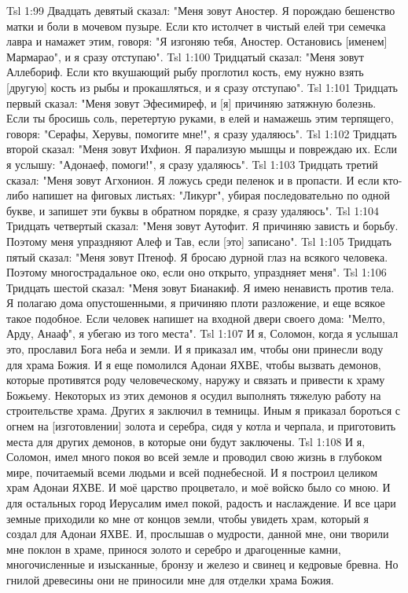 \vs Tsl 1:99 
Двадцать девятый сказал: "Меня зовут Аностер. Я порождаю бешенство матки и боли в мочевом пузыре. Если кто истолчет в чистый елей три семечка лавра и намажет этим, говоря: "Я изгоняю тебя, Аностер. Остановись [именем] Мармарао", и я сразу отступаю".
\vs Tsl 1:100 
Тридцатый сказал: "Меня зовут Аллебориф. Если кто вкушающий рыбу проглотил кость, ему нужно взять [другую] кость из рыбы и прокашляться, и я сразу отступаю".
\vs Tsl 1:101 
Тридцать первый сказал: "Меня зовут Эфесимиреф, и [я] причиняю затяжную болезнь. Если ты бросишь соль, перетертую руками, в елей и намажешь этим терпящего, говоря: "Серафы, Херувы, помогите мне!", я сразу удаляюсь".
\vs Tsl 1:102 
Тридцать второй сказал: "Меня зовут Ихфион. Я парализую мышцы и повреждаю их. Если я услышу: "Адонаеф, помоги!", я сразу удаляюсь".
\vs Tsl 1:103 
Тридцать третий сказал: "Меня зовут Агхонион. Я ложусь среди пеленок и в пропасти. И если кто-либо напишет на фиговых листьях: "Ликург", убирая последовательно по одной букве, и запишет эти буквы в обратном порядке, я сразу удаляюсь".
\vs Tsl 1:104 
Тридцать четвертый сказал: "Меня зовут Аутофит. Я причиняю зависть и борьбу. Поэтому меня упраздняют Алеф и Тав, если [это] записано".
\vs Tsl 1:105 
Тридцать пятый сказал: "Меня зовут Птеноф. Я бросаю дурной глаз на всякого человека. Поэтому многострадальное око, если оно открыто, упраздняет меня".
\vs Tsl 1:106 
Тридцать шестой сказал: "Меня зовут Бианакиф. Я имею ненависть против тела. Я полагаю дома опустошенными, я причиняю плоти разложение, и еще всякое такое подобное. Если человек напишет на входной двери своего дома: "Мелто, Арду, Анааф", я убегаю из того места".
\vs Tsl 1:107 
И я, Соломон, когда я услышал это, прославил Бога неба и земли. И я приказал им, чтобы они принесли воду для храма Божия. И я еще помолился Адонаи ЯХВЕ, чтобы вызвать демонов, которые противятся роду человеческому, наружу и связать и привести к храму Божьему. Некоторых из этих демонов я осудил выполнять тяжелую работу на строительстве храма. Других я заключил в темницы. Иным я приказал бороться с огнем на [изготовлении] золота и серебра, сидя у котла и черпала, и приготовить места для других демонов, в которые они будут заключены.
\vs Tsl 1:108 
И я, Соломон, имел много покоя во всей земле и проводил свою жизнь в глубоком мире, почитаемый всеми людьми и всей поднебесной. И я построил целиком храм Адонаи ЯХВЕ. И моё царство процветало, и моё войско было со мною. И для остальных город Иерусалим имел покой, радость и наслаждение. И все цари земные приходили ко мне от концов земли, чтобы увидеть храм, который я создал для Адонаи ЯХВЕ. И, прослышав о мудрости, данной мне, они творили мне поклон в храме, принося золото и серебро и драгоценные камни, многочисленные и изысканные, бронзу и железо и свинец и кедровые бревна. Но гнилой древесины они не приносили мне для отделки храма Божия.
